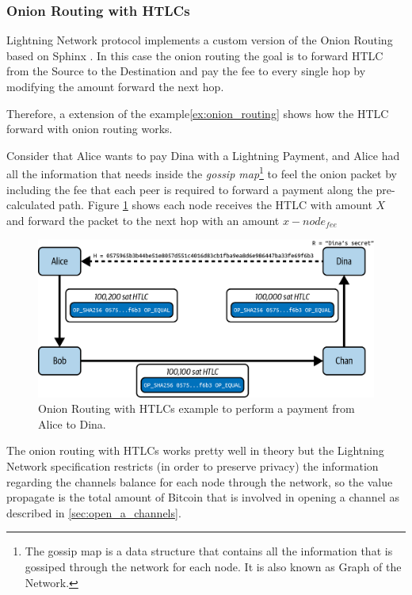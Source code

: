 \subsubsection{Onion Routing with HTLCs}

Lightning Network protocol implements a custom version of the Onion Routing based on Sphinx \cite{cryptoeprint:2008/475}. In this case the onion routing
the goal is to forward HTLC from the Source to the Destination and pay the fee to
every single hop by modifying the amount forward the next hop.

Therefore, a extension of the example\ref{ex:onion_routing} shows how
the HTLC forward with onion routing works.

\begin{example}
  \label{ex:htl_onion_routing}
  Consider that Alice wants to pay Dina with a Lightning Payment, and Alice had all the
  information that needs inside the \emph{gossip map}\footnote{The gossip map is a data structure that contains all the information that is gossiped through the network for each node. It is also known as Graph of the Network.} to feel the
  onion packet by including the fee that each peer is required to forward a payment
  along the pre-calculated path. Figure \ref{fig:routing_path_htlc} shows each node receives the HTLC with
  amount $X$ and forward the packet to the next hop with an amount $x - node_{fee}$

  \begin{figure}[H]
    \begin{center}
      \includegraphics[width=0.6\columnwidth]{imgs/mtln_1008.png}
    \end{center}
    \caption{Onion Routing with HTLCs example to perform a payment from Alice to Dina.}
    \label{fig:routing_path_htlc}
  \end{figure}
\end{example}

The onion routing with HTLCs works pretty well in theory but the Lightning Network
specification restricts (in order to preserve privacy) the information regarding
the channels balance for each node through the network, so the value
propagate is the total amount of Bitcoin that is involved in opening a channel as described in \ref{sec:open_a_channels}.

